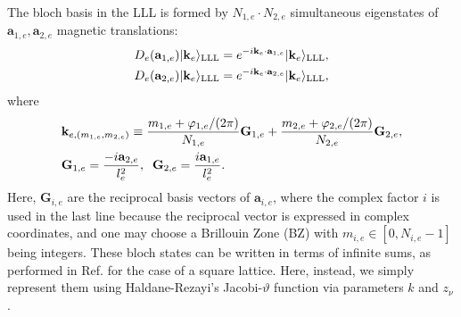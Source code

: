 The bloch basis in the LLL is formed by $N_{1,e}\cdot N_{2,e}$ simultaneous eigenstates of $\mathbf a_{1,e},\mathbf a_{2,e}$ magnetic translations:
\begin{align}
    D_e(\mathbf a_{1,e})|\mathbf k_e\rangle_{\text{LLL}} & =e^{-i\mathbf k_e\cdot \mathbf a_{1,e}}|\mathbf k_e\rangle_{\text{LLL}},\notag                     \\
    D_e(\mathbf a_{2,e})|\mathbf k_e\rangle_{\text{LLL}} & =e^{-i\mathbf k_e\cdot \mathbf a_{2,e}}|\mathbf k_e\rangle_{\text{LLL}},\label{eq:bloch_condition}
\end{align}
where
\begin{align}
     & \mathbf k_{e,(m_{1,e},m_{2,e})}\equiv \frac{m_{1,e}+\varphi_{1,e}/(2\pi)}{N_{1,e}} \mathbf G_{1,e} + \frac{m_{2,e}+\varphi_{2,e}/(2\pi)}{N_{2,e}} \mathbf G_{2,e},\label{eq:k_e_vals} \\
     & \mathbf G_{1,e}=\frac{-i\mathbf a_{2,e}}{l_e^2}, \;\;\mathbf G_{2,e}=\frac{i\mathbf a_{1,e}}{l_e^2}.\notag
\end{align}
Here, $\mathbf G_{i,e}$ are the reciprocal basis vectors of $\mathbf a_{i,e}$, where the complex factor $i$ is used in the last line because the reciprocal vector is expressed in complex coordinates, and one may choose a Brillouin Zone (BZ) with $m_{i,e}\in [0,N_{i,e}-1]$ being integers. These bloch states can be written in terms of infinite sums, as performed in Ref.\cite{jian2013crystal,murthy2012hamiltonian} for the case of a square lattice. Here, instead, we simply represent them using Haldane-Rezayi's Jacobi-$\vartheta$ function via parameters $k$ and $z_\nu$.

